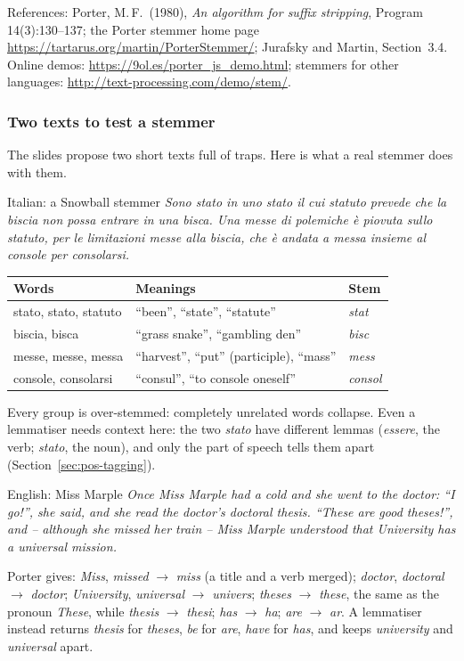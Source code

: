 References: Porter, M.\,F.\ (1980), \emph{An algorithm for suffix stripping},
Program 14(3):130--137; the Porter stemmer home page
\url{https://tartarus.org/martin/PorterStemmer/}; Jurafsky and Martin, Section~3.4.
Online demos: \url{https://9ol.es/porter_js_demo.html}; stemmers for other languages:
\url{http://text-processing.com/demo/stem/}.

\subsubsection{Two texts to test a stemmer}

The slides propose two short texts full of traps. Here is what a real stemmer does with
them.

\begin{nbexample}{Italian: a Snowball stemmer}
\emph{Sono stato in uno stato il cui statuto prevede che la biscia non possa entrare in
una bisca. Una messe di polemiche è piovuta sullo statuto, per le limitazioni messe
alla biscia, che è andata a messa insieme al console per consolarsi.}
\begin{center}
\small
\begin{tabular}{@{}l l l@{}}
\toprule
\textbf{Words} & \textbf{Meanings} & \textbf{Stem} \\
\midrule
stato, stato, statuto & ``been'', ``state'', ``statute'' & \emph{stat} \\
biscia, bisca & ``grass snake'', ``gambling den'' & \emph{bisc} \\
messe, messe, messa & ``harvest'', ``put'' (participle), ``mass'' & \emph{mess} \\
console, consolarsi & ``consul'', ``to console oneself'' & \emph{consol} \\
\bottomrule
\end{tabular}
\end{center}
Every group is over-stemmed: completely unrelated words collapse. Even a lemmatiser
needs context here: the two \emph{stato} have different lemmas (\emph{essere}, the verb;
\emph{stato}, the noun), and only the part of speech tells them apart
(Section~\ref{sec:pos-tagging}).
\end{nbexample}

\begin{nbexample}{English: Miss Marple}
\emph{Once Miss Marple had a cold and she went to the doctor: ``I go!'', she said, and she
read the doctor's doctoral thesis. ``These are good theses!'', and -- although she missed
her train -- Miss Marple understood that University has a universal mission.}

Porter gives: \emph{Miss}, \emph{missed} $\to$ \emph{miss} (a title and a verb merged);
\emph{doctor}, \emph{doctoral} $\to$ \emph{doctor}; \emph{University}, \emph{universal}
$\to$ \emph{univers}; \emph{theses} $\to$ \emph{these}, the same as the pronoun
\emph{These}, while \emph{thesis} $\to$ \emph{thesi}; \emph{has} $\to$ \emph{ha};
\emph{are} $\to$ \emph{ar}. A lemmatiser instead returns \emph{thesis} for
\emph{theses}, \emph{be} for \emph{are}, \emph{have} for \emph{has}, and keeps
\emph{university} and \emph{universal} apart.
\end{nbexample}

